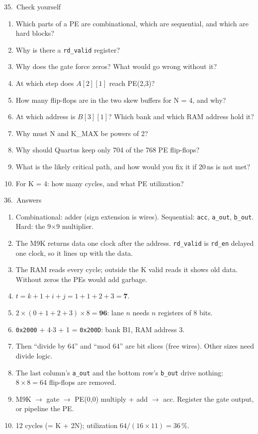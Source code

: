 \documentclass[aspectratio=169,11pt]{beamer}
\newcommand{\sig}[1]{\texttt{#1}}
\newcommand{\hx}[1]{\texttt{0x#1}}
\begin{document}
\begin{frame}{35.\ Check yourself}
  \small
  \begin{enumerate}
    \item Which parts of a PE are combinational, which are sequential, and which are hard blocks?
    \item Why is there a \sig{rd\_valid} register?
    \item Why does the gate force zeros? What would go wrong without it?
    \item At which step does $A[2][1]$ reach PE(2,3)?
    \item How many flip-flops are in the two skew buffers for N = 4, and why?
    \item At which address is $B[3][1]$? Which bank and which RAM address hold it?
    \item Why must N and K\_MAX be powers of 2?
    \item Why should Quartus keep only 704 of the 768 PE flip-flops?
    \item What is the likely critical path, and how would you fix it if 20\,ns is not met?
    \item For K = 4: how many cycles, and what PE utilization?
  \end{enumerate}
\end{frame}

\begin{frame}{36.\ Answers}
  \footnotesize
  \begin{enumerate}
    \item Combinational: adder (sign extension is wires). Sequential: \sig{acc}, \sig{a\_out}, \sig{b\_out}.
          Hard: the 9$\times$9 multiplier.
    \item The M9K returns data one clock after the address. \sig{rd\_valid} is \sig{rd\_en} delayed one clock, so it lines up with the data.
    \item The RAM reads every cycle; outside the K valid reads it shows old data. Without zeros the PEs would add garbage.
    \item $t = k + 1 + i + j = 1 + 1 + 2 + 3 = \mathbf{7}$.
    \item $2 \times (0+1+2+3) \times 8 = \mathbf{96}$: lane $n$ needs $n$ registers of 8 bits.
    \item \hx{2000} + 4$\cdot$3 + 1 = \hx{200D}: bank B1, RAM address 3.
    \item Then ``divide by 64'' and ``mod 64'' are bit slices (free wires). Other sizes need divide logic.
    \item The last column's \sig{a\_out} and the bottom row's \sig{b\_out} drive nothing: $8 \times 8 = 64$ flip-flops are removed.
    \item M9K $\rightarrow$ gate $\rightarrow$ PE(0,0) multiply + add $\rightarrow$ acc. Register the gate output, or pipeline the PE.
    \item 12 cycles (= K + 2N); utilization $64 / (16 \times 11) = 36\,\%$.
  \end{enumerate}
\end{frame}
\end{document}
